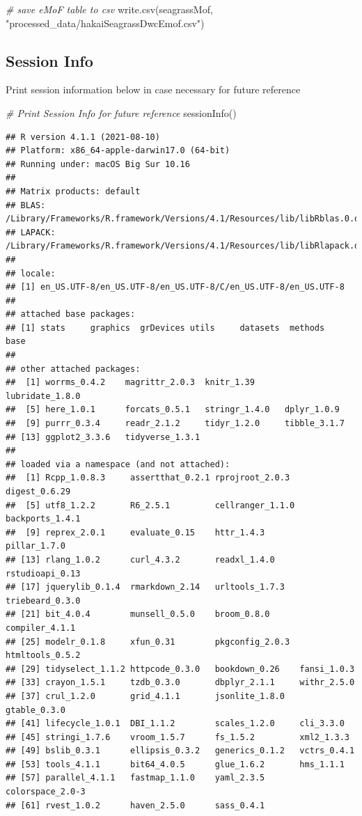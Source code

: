 \documentclass[
]{book}
\newenvironment{Shaded}{\begin{snugshade}}{\end{snugshade}}
\newcommand{\CommentTok}[1]{\textcolor[rgb]{0.56,0.35,0.01}{\textit{#1}}}
\newcommand{\FunctionTok}[1]{\textcolor[rgb]{0.00,0.00,0.00}{#1}}
\newcommand{\NormalTok}[1]{#1}
\newcommand{\StringTok}[1]{\textcolor[rgb]{0.31,0.60,0.02}{#1}}
\begin{document}
\begin{Shaded}
\begin{Highlighting}[]
\CommentTok{\# save eMoF table to csv}
\FunctionTok{write.csv}\NormalTok{(seagrassMof, }\StringTok{"processed\_data/hakaiSeagrassDwcEmof.csv"}\NormalTok{)}
\end{Highlighting}
\end{Shaded}

\hypertarget{session-info}{%
\subsection{Session Info}\label{session-info}}

Print session information below in case necessary for future reference

\begin{Shaded}
\begin{Highlighting}[]
\CommentTok{\# Print Session Info for future reference}
\FunctionTok{sessionInfo}\NormalTok{()}
\end{Highlighting}
\end{Shaded}

\begin{verbatim}
## R version 4.1.1 (2021-08-10)
## Platform: x86_64-apple-darwin17.0 (64-bit)
## Running under: macOS Big Sur 10.16
## 
## Matrix products: default
## BLAS:   /Library/Frameworks/R.framework/Versions/4.1/Resources/lib/libRblas.0.dylib
## LAPACK: /Library/Frameworks/R.framework/Versions/4.1/Resources/lib/libRlapack.dylib
## 
## locale:
## [1] en_US.UTF-8/en_US.UTF-8/en_US.UTF-8/C/en_US.UTF-8/en_US.UTF-8
## 
## attached base packages:
## [1] stats     graphics  grDevices utils     datasets  methods   base     
## 
## other attached packages:
##  [1] worrms_0.4.2    magrittr_2.0.3  knitr_1.39      lubridate_1.8.0
##  [5] here_1.0.1      forcats_0.5.1   stringr_1.4.0   dplyr_1.0.9    
##  [9] purrr_0.3.4     readr_2.1.2     tidyr_1.2.0     tibble_3.1.7   
## [13] ggplot2_3.3.6   tidyverse_1.3.1
## 
## loaded via a namespace (and not attached):
##  [1] Rcpp_1.0.8.3     assertthat_0.2.1 rprojroot_2.0.3  digest_0.6.29   
##  [5] utf8_1.2.2       R6_2.5.1         cellranger_1.1.0 backports_1.4.1 
##  [9] reprex_2.0.1     evaluate_0.15    httr_1.4.3       pillar_1.7.0    
## [13] rlang_1.0.2      curl_4.3.2       readxl_1.4.0     rstudioapi_0.13 
## [17] jquerylib_0.1.4  rmarkdown_2.14   urltools_1.7.3   triebeard_0.3.0 
## [21] bit_4.0.4        munsell_0.5.0    broom_0.8.0      compiler_4.1.1  
## [25] modelr_0.1.8     xfun_0.31        pkgconfig_2.0.3  htmltools_0.5.2 
## [29] tidyselect_1.1.2 httpcode_0.3.0   bookdown_0.26    fansi_1.0.3     
## [33] crayon_1.5.1     tzdb_0.3.0       dbplyr_2.1.1     withr_2.5.0     
## [37] crul_1.2.0       grid_4.1.1       jsonlite_1.8.0   gtable_0.3.0    
## [41] lifecycle_1.0.1  DBI_1.1.2        scales_1.2.0     cli_3.3.0       
## [45] stringi_1.7.6    vroom_1.5.7      fs_1.5.2         xml2_1.3.3      
## [49] bslib_0.3.1      ellipsis_0.3.2   generics_0.1.2   vctrs_0.4.1     
## [53] tools_4.1.1      bit64_4.0.5      glue_1.6.2       hms_1.1.1       
## [57] parallel_4.1.1   fastmap_1.1.0    yaml_2.3.5       colorspace_2.0-3
## [61] rvest_1.0.2      haven_2.5.0      sass_0.4.1
\end{verbatim}
\end{document}

